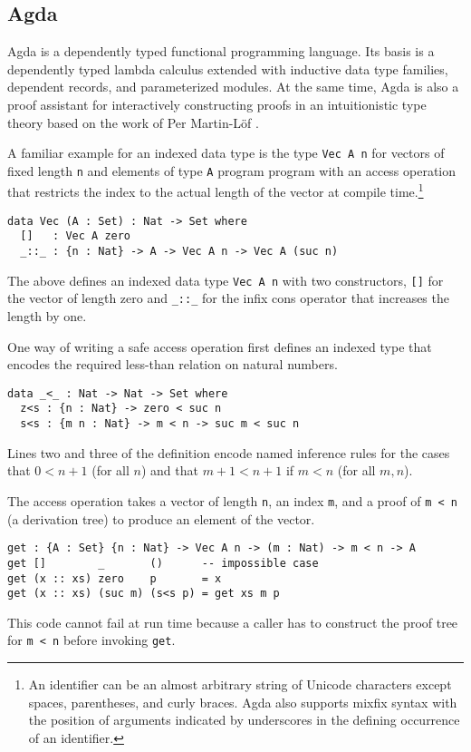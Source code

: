 \documentclass{llncs}
\begin{document}
\subsection{Agda}
\label{sec:agda}

Agda \cite{Norell2008,BoveDybjerNorell2009} is a dependently typed
functional programming language. Its basis is a dependently typed
lambda calculus extended with inductive data type families, dependent
records, and parameterized modules. At the same time, Agda is also a
proof assistant for interactively constructing proofs in an
intuitionistic type theory based on the work of Per Martin-L\"of
\cite{MartinLoef1984}. 

A familiar example for an indexed data type is the type
\verb+Vec A n+ for vectors of fixed length \verb+n+ and elements of
type \verb+A+ program program with an access operation that restricts the index to the
actual length of the vector at compile time.\footnote{An
  identifier can be an almost arbitrary 
  string of Unicode characters except spaces, parentheses, and curly
  braces. Agda also supports mixfix syntax with the position of
  arguments indicated by underscores in the defining occurrence of an
  identifier.} 
\begin{verbatim}
data Vec (A : Set) : Nat -> Set where
  []   : Vec A zero
  _::_ : {n : Nat} -> A -> Vec A n -> Vec A (suc n)
\end{verbatim}
The above defines an indexed data type \verb+Vec A n+ with two
constructors, \verb+[]+ for the vector of length zero and 
\verb+_::_+ for the infix cons operator that increases the length by one.

One way of writing a safe access operation first defines an indexed
type that encodes the required less-than relation on natural numbers.
\begin{verbatim}
data _<_ : Nat -> Nat -> Set where
  z<s : {n : Nat} -> zero < suc n
  s<s : {m n : Nat} -> m < n -> suc m < suc n
\end{verbatim}
Lines two and three of the definition encode named inference rules for
the cases that $0 < n+1$ (for all $n$) and that $m+1 < n+1$ if $m < n$
(for all $m,n$).

The access operation takes a vector of length \verb+n+, an index
\verb+m+, and a proof of \verb+m < n+ (a derivation tree) to produce
an element of the vector.  
\begin{verbatim}
get : {A : Set} {n : Nat} -> Vec A n -> (m : Nat) -> m < n -> A
get []        _       ()      -- impossible case
get (x :: xs) zero    p       = x
get (x :: xs) (suc m) (s<s p) = get xs m p
\end{verbatim}
This code cannot fail at run time because a caller has to
construct the proof tree for \verb+m < n+ before invoking \verb+get+.
\end{document}
